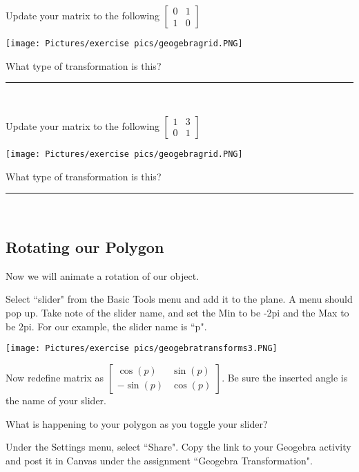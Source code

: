 \begin{exercise}
Update your matrix to the following
$\left[\begin{array}{cc}
0 & 1\\
1 & 0
\end{array}\right]$
\end{exercise}

\begin{center}
\texttt{[image: Pictures/exercise pics/geogebragrid.PNG]}\end{center}

\noindent What type of transformation is this?  \rule{5cm}{0.15mm} \\

\begin{exercise}
Update your matrix to the following
$\left[\begin{array}{cc}
1 & 3\\
0 & 1
\end{array}\right]$
\end{exercise} 

\begin{center}
\texttt{[image: Pictures/exercise pics/geogebragrid.PNG]}\end{center}

\noindent What type of transformation is this?  \rule{5cm}{0.15mm} \\

\subsection{Rotating our Polygon}

\noindent Now we will animate a rotation of our object. \\

\begin{exercise}
Select ``slider" from the Basic Tools menu and add it to the plane. A menu should pop up. Take note of the slider name, and set the Min to be -2pi and the Max to be 2pi. For our example, the slider name is ``p".
\end{exercise}

\begin{center}
\texttt{[image: Pictures/exercise pics/geogebratransforms3.PNG]}   
\end{center}

\begin{exercise}
Now redefine matrix as $\left[\begin{array}{cc}
\cos(p) & \sin(p)\\
-\sin(p) & \cos(p)
\end{array}\right]$. Be sure the inserted angle is the name of your slider.
\end{exercise}

\noindent What is happening to your polygon as you toggle your slider? 

\blanks

\begin{exercise}
Under the Settings menu, select ``Share". Copy the link to your Geogebra activity and post it in Canvas under the assignment ``Geogebra Transformation".
\end{exercise}
